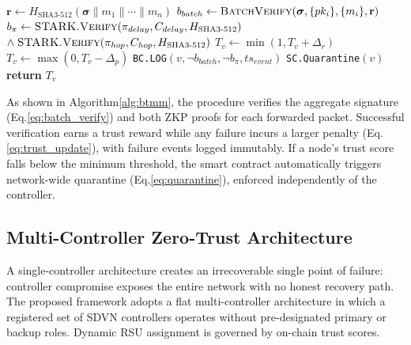 \documentclass[12pt, a4paper]{report}
\begin{document}
{{\begin{algorithm}[htb]
\caption{Blockchain Trust Management and Mitigation
(\texttt{BTMM})}
\begin{algorithmic}[1]
\small
{}
  \State $\mathbf{r} \gets
         H_{\text{SHA3-512}}(
         \boldsymbol{\sigma}\|m_1\|\cdots\|m_n)$
  \State $b_{batch} \gets
         \textsc{BatchVerify}(\boldsymbol{\sigma},
         \{pk_i\}, \{m_i\}, \mathbf{r})$
         \hfill{}
  \State $b_{\pi} \gets
         \textsc{STARK.Verify}(\pi_{delay},
         C_{delay}, H_{\text{SHA3-512}})$
         $\land\;\textsc{STARK.Verify}(\pi_{hop},
         C_{hop}, H_{\text{SHA3-512}})$
    \State $T_v \gets \min(1, T_v + \Delta_r)$
           \hfill{}
  \Else
    \State $T_v \gets \max(0, T_v - \Delta_p)$
           \hfill{}
    \State \texttt{BC.LOG}$(v, \neg b_{batch},
           \neg b_{\pi}, ts_{event})$
  \EndIf
    \State \texttt{SC.Quarantine}$(v)$
           \hfill{}
  \EndIf
  \State \textbf{return} $T_v$
\EndProcedure
\end{algorithmic}
\label{alg:btmm}
\end{algorithm}

As shown in Algorithm\ref{alg:btmm}, the procedure verifies the
aggregate signature (Eq.\ref{eq:batch_verify}) and both ZKP proofs
for each forwarded packet. Successful verification earns a trust
reward while any failure incurs a larger penalty
(Eq.\ref{eq:trust_update}), with failure events logged immutably.
If a node's trust score falls below the minimum threshold, the
smart contract automatically triggers network-wide quarantine
(Eq.\ref{eq:quarantine}), enforced independently of the
controller.

\subsection{Multi-Controller Zero-Trust Architecture}
\label{sec:multi_ctrl}


A single-controller architecture creates an irrecoverable
single point of failure: controller compromise exposes the
entire network with no honest recovery path. The proposed
framework adopts a flat multi-controller architecture in
which a registered set of \ac{SDVN} controllers operates
without pre-designated primary or backup roles. Dynamic
\ac{RSU} assignment is governed by on-chain trust scores.



}}
\end{document}
